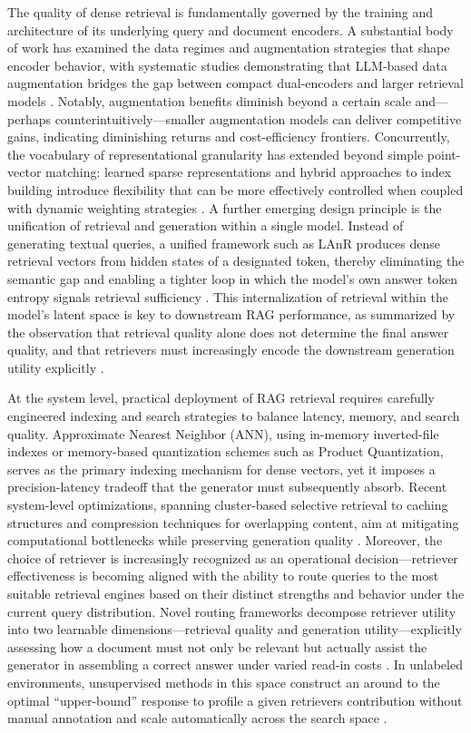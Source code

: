 \documentclass[11pt,a4paper]{article}
\begin{document}
The quality of dense retrieval is fundamentally governed by the training and architecture of its underlying query and document encoders. A substantial body of work has examined the data regimes and augmentation strategies that shape encoder behavior, with systematic studies demonstrating that LLM-based data augmentation bridges the gap between compact dual-encoders and larger retrieval models \cite{arxiv:2509.16442v1}. Notably, augmentation benefits diminish beyond a certain scale and---perhaps counterintuitively---smaller augmentation models can deliver competitive gains, indicating diminishing returns and cost-efficiency frontiers. Concurrently, the vocabulary of representational granularity has extended beyond simple point-vector matching: learned sparse representations and hybrid approaches to index building introduce flexibility that can be more effectively controlled when coupled with dynamic weighting strategies \cite{arxiv:1801.04992v2,arxiv:2510.12323v1}. A further emerging design principle is the unification of retrieval and generation within a single model. Instead of generating textual queries, a unified framework such as LAnR produces dense retrieval vectors from hidden states of a designated token, thereby eliminating the semantic gap and enabling a tighter loop in which the model's own answer token entropy signals retrieval sufficiency \cite{arxiv:2604.17866v2}. This internalization of retrieval within the model's latent space is key to downstream RAG performance, as summarized by the observation that retrieval quality alone does not determine the final answer quality, and that retrievers must increasingly encode the downstream generation utility explicitly \cite{arxiv:2411.07396v1}.

At the system level, practical deployment of RAG retrieval requires carefully engineered indexing and search strategies to balance latency, memory, and search quality. Approximate Nearest Neighbor (ANN), using in-memory inverted-file indexes or memory-based quantization schemes such as Product Quantization, serves as the primary indexing mechanism for dense vectors, yet it imposes a precision-latency tradeoff that the generator must subsequently absorb. Recent system-level optimizations, spanning cluster-based selective retrieval to caching structures and compression techniques for overlapping content, aim at mitigating computational bottlenecks while preserving generation quality \cite{arxiv:2505.12731v2}. Moreover, the choice of retriever is increasingly recognized as an operational decision---retriever effectiveness is becoming aligned with the ability to route queries to the most suitable retrieval engines based on their distinct strengths and behavior under the current query distribution. Novel routing frameworks decompose retriever utility into two learnable dimensions---retrieval quality and generation utility---explicitly assessing how a document must not only be relevant but actually assist the generator in assembling a correct answer under varied read-in costs \cite{arxiv:2506.14412v2}. In unlabeled environments, unsupervised methods in this space construct an around to the optimal ``upper-bound'' response to profile a given retrievers contribution without manual annotation and scale automatically across the search space \cite{arxiv:2501.07793v1}.
\end{document}
